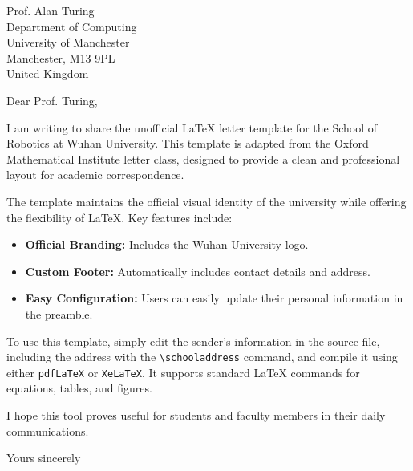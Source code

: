\documentclass{whurobotletter} %
\begin{document}
\begin{letter}{
Prof. Alan Turing\\
Department of Computing\\
University of Manchester\\
Manchester, M13 9PL\\
United Kingdom}

\subject{Unofficial WHU School of Robotics Letter Template}

\opening{Dear Prof. Turing,} %

I am writing to share the unofficial \LaTeX{} letter template for the School of Robotics at Wuhan University. This template is adapted from the Oxford Mathematical Institute letter class, designed to provide a clean and professional layout for academic correspondence.

The template maintains the official visual identity of the university while offering the flexibility of \LaTeX. Key features include:
\begin{itemize}
    \item \textbf{Official Branding:} Includes the Wuhan University logo.
    \item \textbf{Custom Footer:} Automatically includes contact details and address.
    \item \textbf{Easy Configuration:} Users can easily update their personal information in the preamble.
\end{itemize}

To use this template, simply edit the sender's information in the source file, including the address with the \texttt{\textbackslash schooladdress} command, and compile it using either \texttt{pdfLaTeX} or \texttt{XeLaTeX}. It supports standard \LaTeX{} commands for equations, tables, and figures.

I hope this tool proves useful for students and faculty members in their daily communications.

\closing{Yours sincerely} %
\end{letter}
\end{document}
